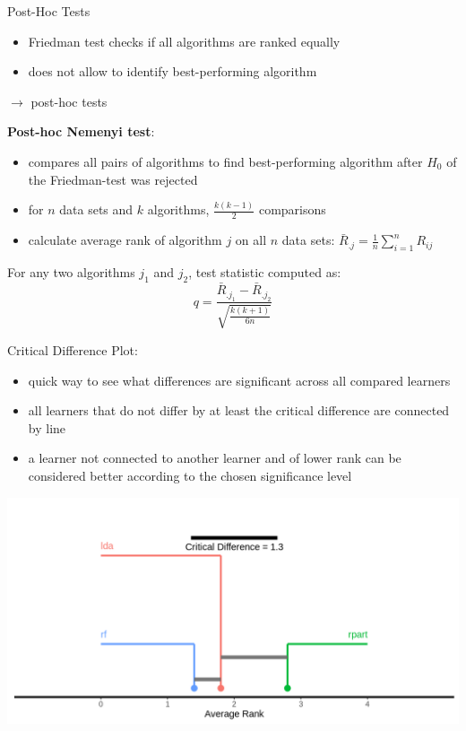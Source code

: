     \begin{frame}[c,allowframebreaks]{Post-Hoc Tests}
        \begin{itemize}
            \item Friedman test checks if all algorithms are ranked equally
            \item does not allow to identify best-performing algorithm
        \end{itemize}
        $\rightarrow$ post-hoc tests

    \bigskip

    \textbf{Post-hoc Nemenyi test}:
    \begin{itemize}
    \item compares all pairs of algorithms to find best-performing algorithm after $H_0$ of the Friedman-test was rejected
    \item for $n$ data sets and $k$ algorithms, $\frac{k(k-1)}{2}$ comparisons
    \item calculate average rank of algorithm $j$ on all $n$ data sets: $\bar{R}_{.j} =\frac{1}{n} \sum_{i=1}^n R_{ij}$
    \end{itemize}

    For any two algorithms $j_1$ and $j_2$, test statistic computed as:
    $$q = \frac{\bar{R}_{.j_1} - \bar{R}_{.j_2}}{\sqrt{\frac{k(k+1)}{6n}}}$$

    \framebreak

    Critical Difference Plot:
    \begin{itemize}
        \item quick way to see what differences are significant across all
            compared learners
        \item all learners that do not differ by at least the critical
            difference are connected by line
        \item a learner not connected to another learner and of lower rank can
            be considered better according to the chosen significance level
    \end{itemize}

    \begin{center}
        \includegraphics[height=.5\textheight]{images/crit-diff-nemenyi}
    \end{center}


\end{frame}
